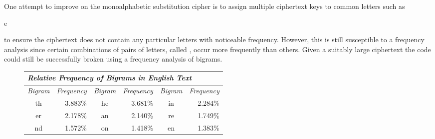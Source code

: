 One attempt to improve on the monoalphabetic substitution cipher is to assign
multiple ciphertext keys to common letters such as \begin{code}e\end{code} to ensure
the ciphertext does not contain any particular letters with noticeable frequency.
However, this is still susceptible to a frequency analysis since certain combinations
of pairs of letters, called , occur more frequently than others.
Given a suitably large ciphertext the code could still be successfully broken using
a frequency analysis of bigrams.
\begin{figure*}[htb]
\begin{tabular}{|c|r|c|r|c|r|} \hline
  \multicolumn{6}{|l|}{\textit{Relative Frequency of Bigrams in English Text}} \\ \hline\hline
  \textit{Bigram} & \textit{Frequency} & \textit{Bigram} & \textit{Frequency}
  & \textit{Bigram} & \textit{Frequency} \\ \hline
  th & 3.883\% &
  he & 3.681\% &
  in & 2.284\% \\
  er & 2.178\% &
  an & 2.140\% &
  re & 1.749\% \\
  nd & 1.572\% &
  on & 1.418\% &
  en & 1.383\% \\ \hline
\end{tabular}
\end{figure*}

